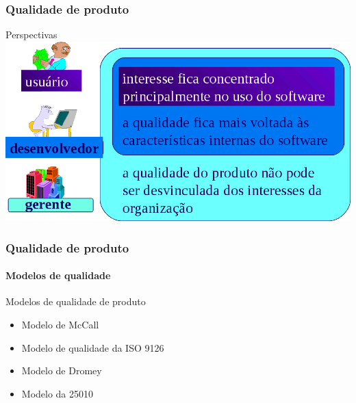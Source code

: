 \begin{frame}
	\frametitle{Qualidade de produto}
	
	\begin{block:fact}{Perspectivas}
		\centering
		\includegraphics[width=\textwidth]{software-engineering/project-management/product/product-quality-perspectives}
	\end{block:fact}
\end{frame}


\begin{frame}
	\frametitle{Qualidade de produto}
	\framesubtitle{Modelos de qualidade}
	
	\begin{block:fact}{Modelos de qualidade de produto}
		\begin{itemize}
			\item Modelo de McCall
			\item Modelo de qualidade da ISO 9126
			\item Modelo de Dromey
			\item Modelo da 25010
		\end{itemize}
	\end{block:fact}
\end{frame}


